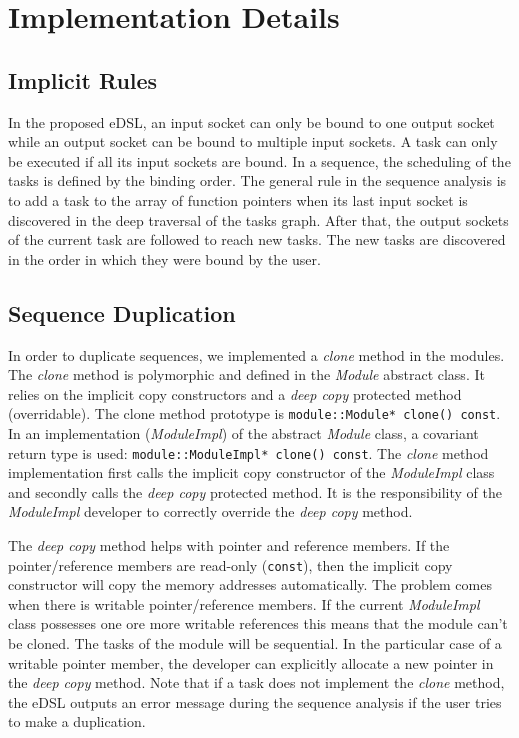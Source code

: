 \section{Implementation Details}

\subsection{Implicit Rules}

In the proposed eDSL, an input socket can only be bound to one output socket
while an output socket can be bound to multiple input sockets. A task can only
be executed if all its input sockets are bound. In a sequence, the scheduling of
the tasks is defined by the binding order. The general rule in the sequence
analysis is to add a task to the array of function pointers when its last input
socket is discovered in the deep traversal of the tasks graph. After that, the
output sockets of the current task are followed to reach new tasks. The new
tasks are discovered in the order in which they were bound by the user.

\subsection{Sequence Duplication}

In order to duplicate sequences, we implemented a \emph{clone} method in the
modules. The \emph{clone} method is polymorphic and defined in the \emph{Module}
abstract class. It relies on the implicit copy constructors and a \emph{deep
copy} protected method (overridable). The clone method prototype is
\verb|module::Module* clone() const|. In an implementation (\emph{ModuleImpl})
of the abstract \emph{Module} class, a covariant return type is used:
\verb|module::ModuleImpl* clone() const|. The \emph{clone} method implementation
first calls the implicit copy constructor of the \emph{ModuleImpl} class and
secondly calls the \emph{deep copy} protected method. It is the responsibility
of the \emph{ModuleImpl} developer to correctly override the \emph{deep copy}
method.

The \emph{deep copy} method helps with pointer and reference members. If the
pointer/reference members are read-only (\verb|const|), then the implicit copy
constructor will copy the memory addresses automatically. The problem comes
when there is writable pointer/reference members. If the current
\emph{ModuleImpl} class possesses one ore more writable references this means
that the module can't be cloned. The tasks of the module will be sequential. In
the particular case of a writable pointer member, the developer can explicitly
allocate a new pointer in the \emph{deep copy} method. Note that if a task does
not implement the \emph{clone} method, the eDSL outputs an error message during
the sequence analysis if the user tries to make a duplication.

